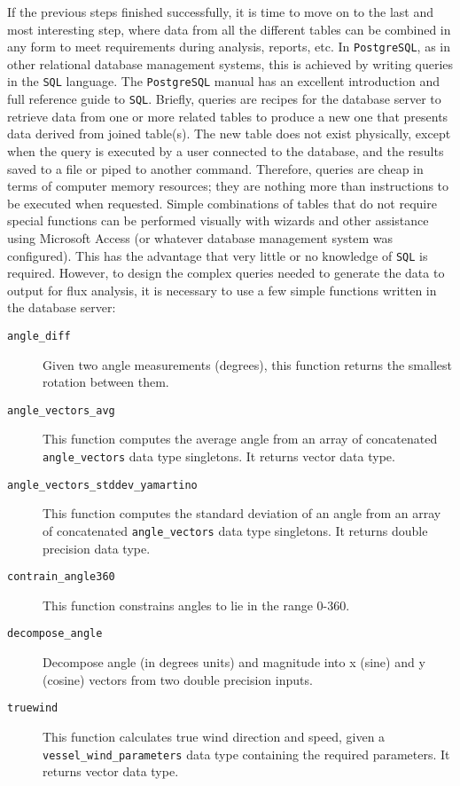 \documentclass[12pt,letterpaper,titlepage,headings=small,numbers=noenddot]%
{scrartcl}
\begin{document}
If the previous steps finished successfully, it is time to move on to the
last and most interesting step, where data from all the different tables
can be combined in any form to meet requirements during analysis, reports,
etc.  In \texttt{PostgreSQL}, as in other relational database management
systems, this is achieved by writing queries in the \texttt{SQL} language.
The \texttt{PostgreSQL} manual has an excellent introduction and full
reference guide to \texttt{SQL}.  Briefly, queries are recipes for the
database server to retrieve data from one or more related tables to produce
a new one that presents data derived from joined table(s).  The new table
does not exist physically, except when the query is executed by a user
connected to the database, and the results saved to a file or piped to
another command.  Therefore, queries are cheap in terms of computer memory
resources; they are nothing more than instructions to be executed when
requested.  Simple combinations of tables that do not require special
functions can be performed visually with wizards and other assistance using
Microsoft Access (or whatever database management system was configured).
This has the advantage that very little or no knowledge of \texttt{SQL} is
required.  However, to design the complex queries needed to generate the
data to output for flux analysis, it is necessary to use a few simple
functions written in the database server:

\begin{description}
\item[\texttt{angle\_diff}] Given two angle measurements (degrees), this
  function returns the smallest rotation between them.
\item[\texttt{angle\_vectors\_avg}] This function computes the average
  angle from an array of concatenated \texttt{angle\_vectors} data type
  singletons.  It returns vector data type.
\item[\texttt{angle\_vectors\_stddev\_yamartino}] This function computes
  the standard deviation of an angle from an array of concatenated
  \texttt{angle\_vectors} data type singletons.  It returns double
  precision data type.
\item[\texttt{contrain\_angle360}] This function constrains angles to lie
  in the range 0-360.
\item[\texttt{decompose\_angle}] Decompose angle (in degrees units) and
  magnitude into x (sine) and y (cosine) vectors from two double precision
  inputs.
\item[\texttt{truewind}] This function calculates true wind direction and
  speed, given a \texttt{vessel\_wind\_parameters} data type containing the
  required parameters.  It returns vector data type.
\end{description}
\end{document}
